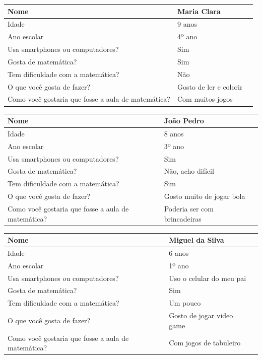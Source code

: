 \documentclass[
    12pt,               %
    openany,          	%
    twoside,            %
    a4paper,            %
    brazil              %
    ]{abntex2}
\begin{document}
\begin{center} \begin{tabular}{ | l | p{5cm} | p{6cm} }
\hline Nome & Maria Clara\\\hline
Idade & 9 anos\\ \hline
Ano escolar & 4º ano\\ \hline Usa
smartphones ou computadores? & Sim \\ \hline
Gosta de matemática? & Sim \\ \hline
Tem dificuldade com a matemática? & Não \\ \hline
O que você gosta de fazer? & Gosto de ler e colorir \\ \hline
Como você gostaria que fosse a aula de matemática? & Com muitos jogos \\ \hline
\end{tabular} \end{center}

\begin{center} \begin{tabular}{ | l | p{5cm} | p{6cm} }
\hline Nome & João Pedro \\\hline
Idade & 8 anos\\ \hline
Ano escolar & 3º ano\\ \hline Usa
smartphones ou computadores? & Sim \\ \hline
Gosta de matemática? & Não, acho difícil \\ \hline
Tem dificuldade com a matemática? & Sim \\ \hline
O que você gosta de fazer? & Gosto muito de jogar bola \\ \hline
Como você gostaria que fosse a aula de matemática? & Poderia ser com brincadeiras \\ \hline
\end{tabular} \end{center}

\begin{center} \begin{tabular}{ | l | p{5cm} | p{6cm} }
\hline Nome & Miguel da Silva \\\hline
Idade & 6 anos\\ \hline
Ano escolar & 1º ano\\ \hline Usa
smartphones ou computadores? & Uso o celular do meu pai \\ \hline
Gosta de matemática? & Sim \\ \hline
Tem dificuldade com a matemática? & Um pouco \\ \hline
O que você gosta de fazer? & Gosto de jogar video game \\ \hline
Como você gostaria que fosse a aula de matemática? & Com jogos de tabuleiro \\ \hline
\end{tabular} \end{center}
\end{document}
